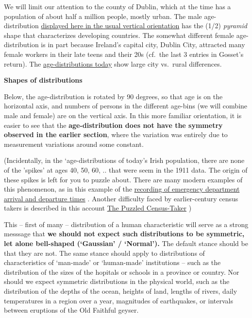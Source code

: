 \documentclass[]{book}
\begin{document}
We will limit our attention to the county of Dublin, which at the time has a population of about half a million people, mostly urban. The male age-distribution \href{http://www.medicine.mcgill.ca/epidemiology/hanley/bios601/MeanQuantiles2019.pdf\#page=18}{displayed here in the usual vertical orientation} has the (1/2) \emph{pyramid} shape that characterizes developing countries. The somewhat different female age-distribution is in part because Ireland's capital city, Dublin City, attracted many female workers in their late teens and their 20s (cf.~the last 3 entries in Gosset's return).
The \href{https://www.cso.ie/en/releasesandpublications/ep/p-cp3oy/cp3/aad/}{age-distributions today}
show large city vs.~rural differences.

\textbf{Shapes of distributions}

Below, the age-distribution is rotated by 90 degrees, so that age is on the horizontal axis, and numbers of persons in the different age-bins (we will combine male and female) are on the vertical axis. In this more familiar orientation, it is easier to see that the \textbf{age-distribution does not have the symmetry observed in the earlier section}, where the variation was entirely due to measurement variations around some constant.

(Incidentally, in the `age-distributions of today's Irish population, there are none of the 'spikes' at ages 40, 50, 60, .. that were seem in the 1911 data. The origin of these spikes is left for you to puzzle about. There are many modern examples of this phenomenon, as in this example of the \href{http://www.medicine.mcgill.ca/epidemiology/hanley/bios601/ch-chapterPlusNotes-ch3-2019.pdf\#page=21}{recording of emergency department arrival and departure times} . Another difficulty faced by earlier-century census takers is described in this account
\href{https://books.google.ca/books?id=fUsPAAAAYAAJ\&pg=PA118\&dq=John+Godfrey+Saxe+census-taker\&hl=en\&sa=X\&ved=0ahUKEwjQv6f04OvVAhUL5IMKHUZfBfgQ6AEIJjAA\#v=onepage\&q=John\%20Godfrey\%20Saxe\%20census-taker\&f=false}{The Puzzled Census-Taker} )

This -- first of many -- distribution of a human characteristic will serve as a strong messsage that \textbf{we should not expect such distributions to be symmetric, let alone bell-shaped (`Gaussian' / `Normal').} The default stance should be that they are not. The same stance should apply to distributions of characteristics of `man-made' or `human-made' institutions -- such as the distribution of the sizes of the hopitals or schools in a province or country. Nor should we expect symmetric distributions in the physical world, such as the distribution of the depths of the ocean, heights of land, lengths of rivers, daily temperatures in a region over a year, magnitudes of earthquakes, or intervals between eruptions of the Old Faithful geyser.
\end{document}
